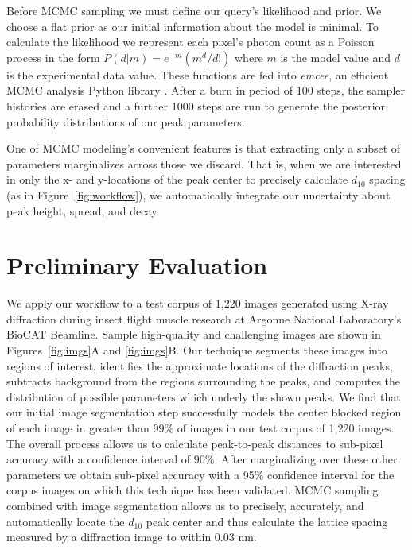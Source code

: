 \documentclass{sig-alternate}
\begin{document}
Before MCMC sampling we must define our query's likelihood and prior.
We choose a flat prior as our initial information about the model is
minimal. To calculate the likelihood we represent each pixel's photon
count as a Poisson process in the form $P(d|m)=e^{-m}
\left(m^{d}/d!\right)$ where $m$ is the model value and $d$ is the
experimental data value. These functions are fed into \textit{emcee},
an efficient MCMC analysis Python library \cite{ForemanMackey2013}.
After a burn in period of 100 steps, the sampler histories are erased
and a further 1000 steps are run to generate the posterior probability
distributions of our peak parameters. 

One of MCMC modeling's convenient features is that extracting only a
subset of parameters marginalizes across those we discard. That is,
when we are interested in only the x- and y-locations of the peak
center to precisely calculate $d_{10}$ spacing (as in
Figure~\ref{fig:workflow}), we automatically integrate our uncertainty
about peak height, spread, and decay.

\section{Preliminary Evaluation}

We apply our workflow to a test corpus of 1,220 images generated using
X-ray diffraction during insect flight muscle research at Argonne
National Laboratory's BioCAT Beamline. Sample high-quality and
challenging images are shown in Figures~\ref{fig:imgs}A and
\ref{fig:imgs}B. Our technique segments these images into regions of
interest, identifies the approximate locations of the diffraction
peaks, subtracts background from the regions surrounding the peaks,
and computes the distribution of possible parameters which underly the
shown peaks.  We find that our initial image segmentation step
successfully models the center blocked region of each image in greater
than 99\% of images in our test corpus of 1,220 images. The overall
process allows us to calculate peak-to-peak distances to sub-pixel
accuracy with a confidence interval of 90\%.  After marginalizing over
these other parameters we obtain sub-pixel accuracy with a 95\%
confidence interval for the corpus images on which this technique has
been validated.  MCMC sampling combined with image segmentation allows
us to precisely, accurately, and automatically locate the $d_{10}$
peak center and thus calculate the lattice spacing measured by a
diffraction image to within 0.03 nm.
\end{document}
